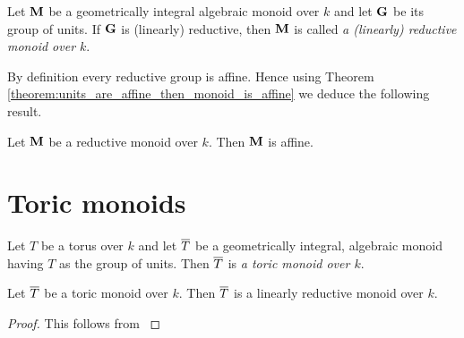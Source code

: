 \begin{definition}
Let $\mathbf{M}$ be a geometrically integral algebraic monoid over $k$ and let $\mathbf{G}$ be its group of units. If $\mathbf{G}$ is (linearly) reductive, then $\mathbf{M}$ is called \textit{a (linearly) reductive monoid over $k$}.
\end{definition}
\noindent
By definition every reductive group is affine. Hence using Theorem \ref{theorem:units_are_affine_then_monoid_is_affine} we deduce the following result.

\begin{corollary}\label{corollary:reductive_monoids_are_affine}
Let $\mathbf{M}$ be a reductive monoid over $k$. Then $\mathbf{M}$ is affine.
\end{corollary}

\section{Toric monoids}

\begin{definition}
Let $T$ be a torus over $k$ and let $\overline{T}$ be a geometrically integral, algebraic monoid having $T$ as the group of units. Then $\overline{T}$ is \textit{a toric monoid over $k$}.
\end{definition}

\begin{corollary}\label{corollary:every_toric_monoid_is_linearly_reductive}
Let $\overline{T}$ be a toric monoid over $k$. Then $\overline{T}$ is a linearly reductive monoid over $k$.
\end{corollary}
\begin{proof}
This follows from {\cite[Corollary 10.4]{Group_schemes_over_field}}
\end{proof}

